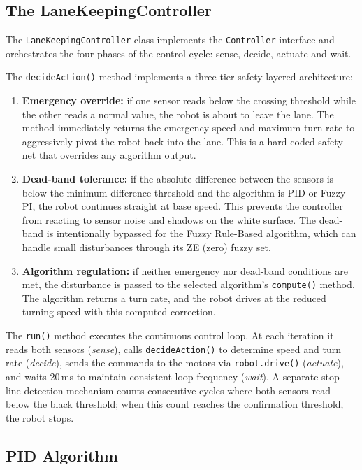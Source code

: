 \subsection{The LaneKeepingController}
\label{sec:lk-controller}

The \texttt{LaneKeepingController} class implements the \texttt{Controller} interface and orchestrates the four phases of the control cycle: sense, decide, actuate and wait.

The \texttt{decideAction()} method implements a three-tier safety-layered architecture:

\begin{enumerate}
    \item \textbf{Emergency override:} if one sensor reads below the crossing threshold while the other reads a normal value, the robot is about to leave the lane. The method immediately returns the emergency speed and maximum turn rate to aggressively pivot the robot back into the lane. This is a hard-coded safety net that overrides any algorithm output.
    \item \textbf{Dead-band tolerance:} if the absolute difference between the sensors is below the minimum difference threshold and the algorithm is PID or Fuzzy PI, the robot continues straight at base speed. This prevents the controller from reacting to sensor noise and shadows on the white surface. The dead-band is intentionally bypassed for the Fuzzy Rule-Based algorithm, which can handle small disturbances through its ZE (zero) fuzzy set.
    \item \textbf{Algorithm regulation:} if neither emergency nor dead-band conditions are met, the disturbance is passed to the selected algorithm's \texttt{compute()} method. The algorithm returns a turn rate, and the robot drives at the reduced turning speed with this computed correction.
\end{enumerate}

The \texttt{run()} method executes the continuous control loop. At each iteration it reads both sensors (\textit{sense}), calls \texttt{decideAction()} to determine speed and turn rate (\textit{decide}), sends the commands to the motors via \texttt{robot.drive()} (\textit{actuate}), and waits 20\,ms to maintain consistent loop frequency (\textit{wait}). A separate stop-line detection mechanism counts consecutive cycles where both sensors read below the black threshold; when this count reaches the confirmation threshold, the robot stops.


\subsection{PID Algorithm}
\label{sec:pid}

